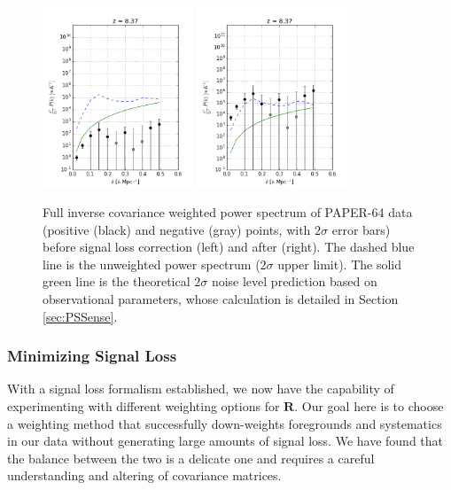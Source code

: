 \documentclass[preprint2,numberedappendix,tighten]{aastex6}  %
\begin{document}
\begin{figure}
	\centering
	\includegraphics[width=0.4\textwidth]{plots/ps2_data_nosigloss.png}
	\includegraphics[width=0.4\textwidth]{plots/ps2_data.png}
	\caption{Full inverse covariance weighted power spectrum of PAPER-64 data (positive (black) and negative (gray) points, 
with $2\sigma$ error bars) before signal loss correction (left) and after (right). The dashed blue line is the unweighted power 
spectrum ($2\sigma$ upper limit). The solid green line is the theoretical $2\sigma$ noise level prediction based on observational 
parameters, whose calculation is detailed in Section \ref{sec:PSSense}.}
	\label{fig:ps2_data}
\end{figure}


\subsubsection{Minimizing Signal Loss}
\label{sec:Weight}

With a signal loss formalism established, we now have the capability of experimenting 
with different weighting options for $\textbf{R}$. Our goal here is to choose a weighting method that successfully down-weights 
foregrounds and systematics in our data without generating large amounts of signal loss. We have found that the balance 
between the two is a delicate one and requires a careful understanding and altering of covariance matrices. 
\end{document}
